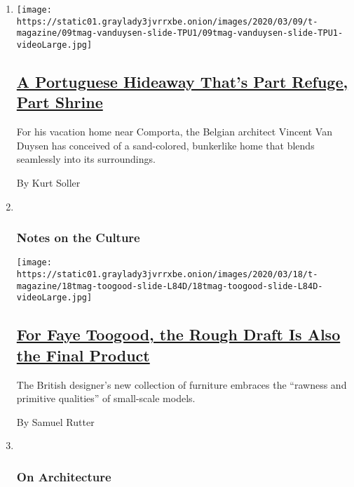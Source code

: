 \begin{enumerate}
\def\labelenumi{\arabic{enumi}.}
\item
  \texttt{[image: https://static01.graylady3jvrrxbe.onion/images/2020/03/09/t-magazine/09tmag-vanduysen-slide-TPU1/09tmag-vanduysen-slide-TPU1-videoLarge.jpg]}

  \hypertarget{a-portuguese-hideaway-thats-part-refuge-part-shrine}{%
  \subsection{\texorpdfstring{\href{/2020/03/09/t-magazine/portugal-home-vincent-van-duysen.html}{A
  Portuguese Hideaway That's Part Refuge, Part
  Shrine}}{A Portuguese Hideaway That's Part Refuge, Part Shrine}}\label{a-portuguese-hideaway-thats-part-refuge-part-shrine}}

  For his vacation home near Comporta, the Belgian architect Vincent Van
  Duysen has conceived of a sand-colored, bunkerlike home that blends
  seamlessly into its surroundings.

  By Kurt Soller
\item ~
  \hypertarget{notes-on-the-culture}{%
  \subsubsection{Notes on the Culture}\label{notes-on-the-culture}}

  \texttt{[image: https://static01.graylady3jvrrxbe.onion/images/2020/03/18/t-magazine/18tmag-toogood-slide-L84D/18tmag-toogood-slide-L84D-videoLarge.jpg]}

  \hypertarget{for-faye-toogood-the-rough-draft-is-also-the-final-product}{%
  \subsection{\texorpdfstring{\href{/2020/03/18/t-magazine/faye-toogood-maquette-show.html}{For
  Faye Toogood, the Rough Draft Is Also the Final
  Product}}{For Faye Toogood, the Rough Draft Is Also the Final Product}}\label{for-faye-toogood-the-rough-draft-is-also-the-final-product}}

  The British designer's new collection of furniture embraces the
  ``rawness and primitive qualities'' of small-scale models.

  By Samuel Rutter
\item ~
  \hypertarget{on-architecture}{%
  \subsubsection{On Architecture}\label{on-architecture}}


\end{enumerate}
